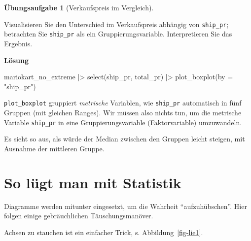 \documentclass[
  letterpaper,
]{scrbook}
\newenvironment{Shaded}{\begin{snugshade}}{\end{snugshade}}
\newcommand{\AttributeTok}[1]{\textcolor[rgb]{0.40,0.45,0.13}{#1}}
\newcommand{\FunctionTok}[1]{\textcolor[rgb]{0.28,0.35,0.67}{#1}}
\newcommand{\NormalTok}[1]{\textcolor[rgb]{0.00,0.23,0.31}{#1}}
\newcommand{\SpecialCharTok}[1]{\textcolor[rgb]{0.37,0.37,0.37}{#1}}
\newcommand{\StringTok}[1]{\textcolor[rgb]{0.13,0.47,0.30}{#1}}
\theoremstyle{definition}
\newtheorem{exercise}{Übungsaufgabe}[chapter]
\theoremstyle{definition}
\theoremstyle{definition}
\theoremstyle{remark}
\begin{document}
\begin{exercise}[Verkaufspreis im
Vergleich]\protect\hypertarget{exr-diff-plot}{}\label{exr-diff-plot}

Visualisieren Sie den Unterschied im Verkaufspreis abhängig von
\texttt{ship\_pr}; betrachten Sie \texttt{ship\_pr} als ein
Gruppierungsvariable. Interpretieren Sie das Ergebnis.

\textbf{Lösung}

\begin{Shaded}
\begin{Highlighting}[]
\NormalTok{mariokart\_no\_extreme }\SpecialCharTok{|\textgreater{}} 
  \FunctionTok{select}\NormalTok{(ship\_pr, total\_pr) }\SpecialCharTok{|\textgreater{}} 
  \FunctionTok{plot\_boxplot}\NormalTok{(}\AttributeTok{by =} \StringTok{"ship\_pr"}\NormalTok{)}
\end{Highlighting}
\end{Shaded}

\texttt{plot\_boxplot} gruppiert \emph{metrische} Variablen, wie
\texttt{ship\_pr} automatisch in fünf Gruppen (mit gleichen Ranges). Wir
müssen also nichts tun, um die metrische Variable \texttt{ship\_pr} in
eine Gruppierungsvariable (Faktorvariable) umzuwandeln.

Es sieht so aus, als würde der Median zwischen den Gruppen leicht
steigen, mit Ausnahme der mittleren Gruppe.

\end{exercise}

\section{So lügt man mit Statistik}\label{so-luxfcgt-man-mit-statistik}

Diagramme werden mitunter eingesetzt, um die Wahrheit
\enquote{aufzuhübschen}. Hier folgen einige gebräuchlichen
Täuschungsmanöver.

Achsen zu stauchen ist ein einfacher Trick, s. Abbildung~\ref{fig-lie1}.
\end{document}
